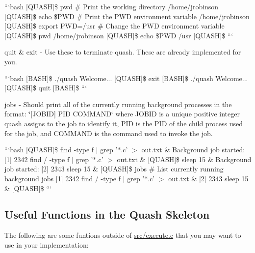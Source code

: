 ```bash \mbox{[}Q\-U\-A\-S\-H\mbox{]}\$ pwd \# Print the working directory /home/jrobinson \mbox{[}Q\-U\-A\-S\-H\mbox{]}\$ echo \$\-P\-W\-D \# Print the P\-W\-D environment variable /home/jrobinson \mbox{[}Q\-U\-A\-S\-H\mbox{]}\$ export P\-W\-D=/usr \# Change the P\-W\-D environment variable \mbox{[}Q\-U\-A\-S\-H\mbox{]}\$ pwd /home/jrobinson \mbox{[}Q\-U\-A\-S\-H\mbox{]}\$ echo \$\-P\-W\-D /usr \mbox{[}Q\-U\-A\-S\-H\mbox{]}\$ ```


\begin{DoxyItemize}
\item {\ttfamily quit} \& {\ttfamily exit} -\/ Use these to terminate quash. These are already implemented for you.
\end{DoxyItemize}

```bash \mbox{[}B\-A\-S\-H\mbox{]}\$ ./quash Welcome... \mbox{[}Q\-U\-A\-S\-H\mbox{]}\$ exit \mbox{[}B\-A\-S\-H\mbox{]}\$ ./quash Welcome... \mbox{[}Q\-U\-A\-S\-H\mbox{]}\$ quit \mbox{[}B\-A\-S\-H\mbox{]}\$ ```


\begin{DoxyItemize}
\item {\ttfamily jobs} -\/ Should print all of the currently running background processes in the format\-: \char`\"{}\mbox{[}\-J\-O\-B\-I\-D\mbox{]} P\-I\-D C\-O\-M\-M\-A\-N\-D\char`\"{} where J\-O\-B\-I\-D is a unique positive integer quash assigns to the job to identify it, P\-I\-D is the P\-I\-D of the child process used for the job, and C\-O\-M\-M\-A\-N\-D is the command used to invoke the job.
\end{DoxyItemize}

```bash \mbox{[}Q\-U\-A\-S\-H\mbox{]}\$ find -\/type f $\vert$ grep '$\ast$.c' $>$ out.\-txt \& Background job started\-: \mbox{[}1\mbox{]} 2342 find / -\/type f $\vert$ grep '$\ast$.c' $>$ out.\-txt \& \mbox{[}Q\-U\-A\-S\-H\mbox{]}\$ sleep 15 \& Background job started\-: \mbox{[}2\mbox{]} 2343 sleep 15 \& \mbox{[}Q\-U\-A\-S\-H\mbox{]}\$ jobs \# List currently running background jobs \mbox{[}1\mbox{]} 2342 find / -\/type f $\vert$ grep '$\ast$.c' $>$ out.\-txt \& \mbox{[}2\mbox{]} 2343 sleep 15 \& \mbox{[}Q\-U\-A\-S\-H\mbox{]}\$ ```

\subsection*{Useful Functions in the Quash Skeleton}

The following are some funtions outside of \hyperlink{execute_8c}{src/execute.\-c} that you may want to use in your implementation\-:


